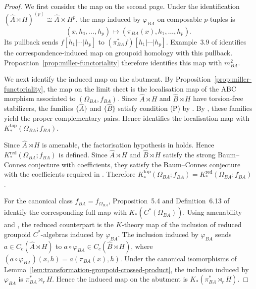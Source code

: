 \documentclass[pdflatex,sn-mathphys-num]{sn-jnl}%
\theoremstyle{plain}
\theoremstyle{remark}
\theoremstyle{definition}
\numberwithin{equation}{section}
\begin{document}
\begin{proof}
We first consider the map on the second page. Under the identification \( (\widehat A\rtimes H)^{(p)}\cong\widehat A\times H^p \), the map induced by \( \varphi_{BA} \) on composable \( p \)-tuples is
\[
(x,h_1,\ldots,h_p)
\longmapsto
(\pi_{BA}(x),h_1,\ldots,h_p).
\]
Its pullback sends \( f[h_1|\cdots|h_p] \) to \( (\pi_{BA}^*f)[h_1|\cdots|h_p] \). Example~3.9 of \cite{miller2025ample} identifies the correspondence-induced map on groupoid homology with this pullback. Proposition~\ref{prop:miller-functoriality} therefore identifies this map with \( m_{BA}^2 \).

We next identify the induced map on the abutment. By Proposition~\ref{prop:miller-functoriality}, the map on the limit sheet is the localisation map of the ABC morphism associated to \( (\Omega_{BA},f_{BA}) \). Since \( \widehat A\rtimes H \) and \( \widehat B\rtimes H \) have torsion-free stabilizers, the families \( \{\widehat A\} \) and \( \{\widehat B\} \) satisfy condition (P) by \cite[Example~3.18]{miller2025isomorphisms}. By \cite[Proposition~3.17]{miller2025isomorphisms}, these families yield the proper complementary pairs. Hence \cite[Example~5.11]{miller2025isomorphisms} identifies the localisation map with \( K_*^{\mathrm{top}}(\Omega_{BA};f_{BA}) \).

Since \( \widehat A\rtimes H \) is amenable, the factorisation hypothesis in \cite[Example~5.11]{miller2025isomorphisms} holds. Hence \( K_*^{\mathrm{red}}(\Omega_{BA};f_{BA}) \) is defined. Since \( \widehat A\rtimes H \) and \( \widehat B\rtimes H \) satisfy the strong Baum--Connes conjecture with coefficients, they satisfy the Baum--Connes conjecture with the coefficients required in \cite[Example~5.11]{miller2025isomorphisms}. Therefore \( K_*^{\mathrm{top}}(\Omega_{BA};f_{BA}) = K_*^{\mathrm{red}}(\Omega_{BA};f_{BA}) \).

For the canonical class \( f_{BA}=f_{\Omega_{BA}} \), Proposition~5.4 and Definition~6.13 of \cite{miller2023functors} identify the corresponding full map with \( K_*(C^*(\Omega_{BA})) \). Using amenability and \cite[Example~3.6]{miller2023functors}, the reduced counterpart is the \( K \)-theory map of the inclusion of reduced groupoid \( C^* \)-algebras induced by \( \varphi_{BA} \). The inclusion induced by \( \varphi_{BA} \) sends \( a\in C_c(\widehat A\rtimes H) \) to \( a\circ\varphi_{BA}\in C_c(\widehat B\rtimes H) \), where \( (a\circ\varphi_{BA})(x,h)=a(\pi_{BA}(x),h) \). Under the canonical isomorphisms of Lemma~\ref{lem:transformation-groupoid-crossed-product}, the inclusion induced by \( \varphi_{BA} \) is \( \pi_{BA}^*\rtimes_r H \). Hence the induced map on the abutment is \( K_*(\pi_{BA}^*\rtimes_r H) \).
\end{proof}
\end{document}

